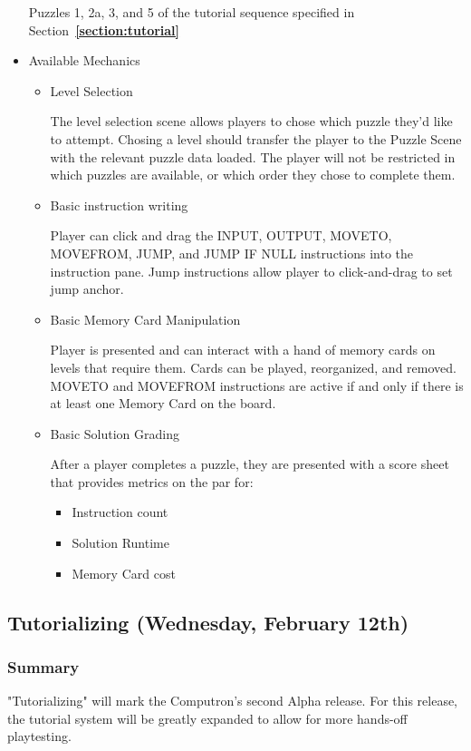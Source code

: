 \begin{itemize}
  Puzzles 1, 2a, 3, and 5 of the tutorial sequence specified in Section~\textbf{\ref{section:tutorial}}

  \item Available Mechanics
  \begin{itemize}
    \item Level Selection
    
    The level selection scene allows players to chose which puzzle they'd like to attempt. Chosing a level should transfer the player to the Puzzle Scene with the relevant puzzle data loaded. The player will not be restricted in which puzzles are available, or which order they chose to complete them.

    \item Basic instruction writing
    
    Player can click and drag the INPUT, OUTPUT, MOVETO, MOVEFROM, JUMP, and JUMP IF NULL instructions into the instruction pane. Jump instructions allow player to click-and-drag to set jump anchor.

    \item Basic Memory Card Manipulation
    
    Player is presented and can interact with a hand of memory cards on levels that require them. Cards can be played, reorganized, and removed. MOVETO and MOVEFROM instructions are active if and only if there is at least one Memory Card on the board.

    \item Basic Solution Grading
    
    After a player completes a puzzle, they are presented with a score sheet that provides metrics on the par for:
    \begin{itemize}
      \item Instruction count
      \item Solution Runtime
      \item Memory Card cost
    \end{itemize}
  \end{itemize}
\end{itemize}

\subsection{Tutorializing (Wednesday, February 12th)}

\subsubsection*{Summary}
"Tutorializing" will mark the Computron's second Alpha release. For this release, the tutorial system will be greatly expanded to allow for more hands-off playtesting.

